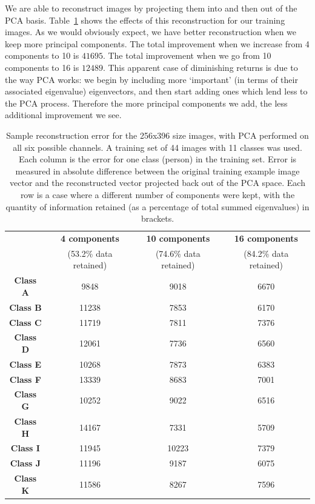 We are able to reconstruct images by projecting them into and then out of the PCA basis. Table~\ref{tbl:face-rec-2} shows the effects of this reconstruction for our training images. As we would obviously expect, we have better reconstruction when we keep more principal components. The total improvement when we increase from 4 components to 10 is $41695$. The total improvement when we go from 10 components to 16 is $12489$. This apparent case of diminishing returns is due to the way PCA works: we begin by including more `important' (in terms of their associated eigenvalue) eigenvectors, and then start adding ones which lend less to the PCA process. Therefore the more principal components we add, the less additional improvement we see.

\begin{table}[htpb]
  \centering
  \begin{tabular}{c c c c}
    \toprule
     & \textbf{4 components} & \textbf{10 components} & \textbf{16 components} \\
     & (53.2\% data retained) & (74.6\% data retained) & (84.2\% data retained) \\
    \midrule
    \textbf{Class A} & 9848 & 9018 & 6670\\
    \textbf{Class B} & 11238 & 7853 & 6170\\
    \textbf{Class C} & 11719 & 7811 & 7376\\
    \textbf{Class D} & 12061 & 7736 & 6560\\
    \textbf{Class E} & 10268 & 7873 & 6383\\
    \textbf{Class F} & 13339 & 8683 & 7001\\
    \textbf{Class G} & 10252 & 9022 & 6516\\
    \textbf{Class H} & 14167 & 7331 & 5709\\
    \textbf{Class I} & 11945 & 10223 & 7379\\
    \textbf{Class J} & 11196 & 9187 & 6075\\
    \textbf{Class K} & 11586 & 8267 & 7596\\
    \bottomrule
  \end{tabular}
  \caption[Sample reconstruction error for the 256x396 size images]{Sample reconstruction error for the 256x396 size images, with PCA performed on all six possible channels. A training set of 44 images with 11 classes was used. Each column is the error for one class (person) in the training set. Error is measured in absolute difference between the original training example image vector and the reconstructed vector projected back out of the PCA space. Each row is a case where a different number of components were kept, with the quantity of information retained (as a percentage of total summed eigenvalues) in brackets.}
  \label{tbl:face-rec-2}
\end{table}

